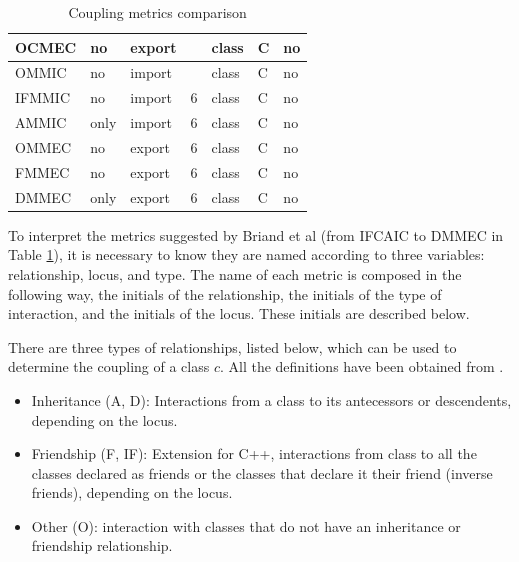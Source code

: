 \begin{table}[p]
\begin{center}
\begin{tabular}{|l|l|l|l|l|l|l|}
    OCMEC & no & export &  & class & C & no \\
    \hline
    OMMIC & no & import &  & class & C & no \\
    IFMMIC & no & import & 6 & class & C & no \\
    AMMIC & only & import & 6 & class & C & no \\
    OMMEC & no & export & 6 & class & C & no \\
    FMMEC & no & export & 6 & class & C & no \\
    DMMEC & only & export & 6 & class & C & no \\
    \hline
    \end{tabular}
    \end{center}
    \caption{Coupling metrics comparison}
    \label{table:coupling-metrics}
\end{table}

\bigskip\noindent
To interpret the metrics suggested by Briand et al \cite{briand1997investigation}  (from IFCAIC to DMMEC in Table \ref{table:coupling-metrics}), it is necessary to know they are named according to three variables: relationship, locus, and type. The name of each metric is composed in the following way, the initials of the relationship, the initials of the type of interaction, and the initials of the locus. These initials are described below.

\bigskip\noindent
There are three types of relationships, listed below, which can be used to determine the coupling of a class $c$. All the definitions have been obtained from \cite{briand1997investigation}.

\begin{itemize}
  \item Inheritance (A, D): Interactions from a class to its antecessors or descendents, depending on the locus.
  \item Friendship (F, IF): Extension for C++, interactions from class to all the  classes declared as friends or the classes that declare it their friend (inverse friends), depending on the locus.
  \item Other (O): interaction with classes that do not have an inheritance or friendship relationship.
\end{itemize}

